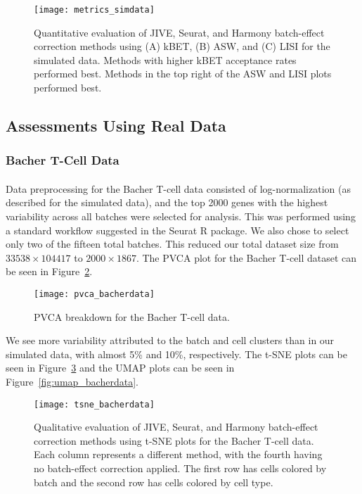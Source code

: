 \documentclass[
12pt, %
letterpaper, %
oneside, %
headinclude,footinclude, %
BCOR5mm, %
]{scrartcl}
\begin{document}
\begin{figure}[H]
    \centering 
    \texttt{[image: metrics\_simdata]} 
    \caption[Metrics for Simulated Data]{Quantitative evaluation of JIVE, Seurat, and Harmony batch-effect correction methods using (A) kBET, (B) ASW, and (C) LISI for the simulated data. Methods with higher kBET acceptance rates performed best. Methods in the top right of the ASW and LISI plots performed best.}
    \label{fig:metrics_simdata} 
\end{figure}


\subsection{Assessments Using Real Data}

\subsubsection*{Bacher T-Cell Data}

\paragraph*{}
Data preprocessing for the Bacher T-cell data consisted of log-normalization (as described for the simulated data), and the top 2000 genes with the highest variability across all batches were selected for analysis. This was performed using a standard workflow suggested in the Seurat R package. We also chose to select only two of the fifteen total batches. This reduced our total dataset size from $33538 \times 104417$ to $2000 \times 1867$. The PVCA plot for the Bacher T-cell dataset can be seen in Figure~\ref{fig:pvca_bacherdata}.

\begin{figure}[ht]
    \centering 
    \texttt{[image: pvca\_bacherdata]} 
    \caption[PVCA Breakdown for the Bacher T-Cell Data]{PVCA breakdown for the Bacher T-cell data.}
    \label{fig:pvca_bacherdata} 
\end{figure}

We see more variability attributed to the batch and cell clusters than in our simulated data, with almost 5\% and 10\%, respectively. The t-SNE plots can be seen in Figure~\ref{fig:tsne_bacherdata} and the UMAP plots can be seen in Figure~\ref{fig:umap_bacherdata}.

\begin{figure}[H]
    \centering 
    \texttt{[image: tsne\_bacherdata]} 
    \caption[t-SNE Plots for the Bacher T-Cell Data]{Qualitative evaluation of JIVE, Seurat, and Harmony batch-effect correction methods using t-SNE plots for the Bacher T-cell data. Each column represents a different method, with the fourth having no batch-effect correction applied. The first row has cells colored by batch and the second row has cells colored by cell type.}
    \label{fig:tsne_bacherdata}
\end{figure}
\end{document}
